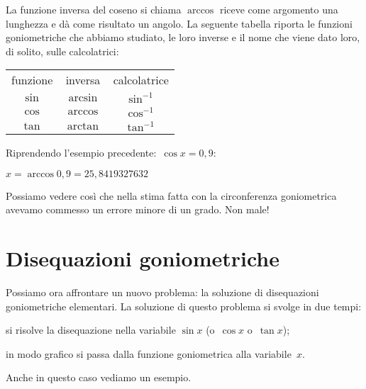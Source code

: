 La funzione inversa del coseno si chiama $\arccos$ riceve come argomento una
lunghezza e dà come risultato un angolo. La seguente tabella riporta le 
funzioni goniometriche che abbiamo studiato, le loro inverse e il nome che 
viene dato loro, di solito, sulle calcolatrici:

\begin{center}
\begin{tabular}{ccc}
funzione & inversa & calcolatrice\\
$\sin$ & $\arcsin$ & $\sin^{-1}$\\
$\cos$ & $\arccos$ & $\cos^{-1}$\\
$\tan$ & $\arctan$ & $\tan^{-1}$
\end{tabular}
\end{center}

\begin{esempio}
 Riprendendo l'esempio precedente:~$\cos x = 0,9$:
 
 $x = \arccos 0,9 = 25,8419327632$ 
 
 Possiamo vedere così che nella stima fatta con la circonferenza goniometrica 
 avevamo commesso un errore minore di un grado. Non male!
\end{esempio}


\section{Disequazioni goniometriche}
\label{sec:gonio_disequazionigonio}

Possiamo ora affrontare un nuovo problema: la soluzione di disequazioni 
goniometriche elementari. La soluzione di questo problema si svolge in due 
tempi:
\begin{enumerate*}
 \item si risolve la disequazione nella variabile $\sin x$ 
  (o~$\cos x$ o~$\tan x$);
 \item in modo grafico si passa dalla funzione goniometrica alla 
variabile~$x$.
\end{enumerate*}

Anche in questo caso vediamo un esempio.

